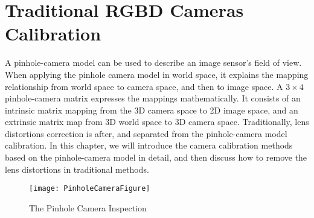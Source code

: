 \chapter{Traditional \gls{RGBD} Cameras Calibration} %
\label{chapterTraditionalCalibration} %
A pinhole-camera model can be used to describe an image sensor's field of view. When applying the pinhole camera model in world space, it explains the mapping relationship from world space to camera space, and then to image space. A $3\times4$ pinhole-camera matrix expresses the mappings mathematically. It consists of an intrinsic matrix mapping from the \gls{3D} camera space to 2D image space, and an extrinsic matrix map from \gls{3D} world space to \gls{3D} camera space. Traditionally, lens distortions correction is after, and separated from the pinhole-camera model calibration. In this chapter, we will introduce the camera calibration methods based on the pinhole-camera model in detail, and then discuss how to remove the lens distortions in traditional methods.
%
\begin{figure}[!b]
\centering
\texttt{[image: PinholeCameraFigure]}
\caption{The Pinhole Camera Inspection}
\label{PinholeCameraFigure}
\end{figure}%
